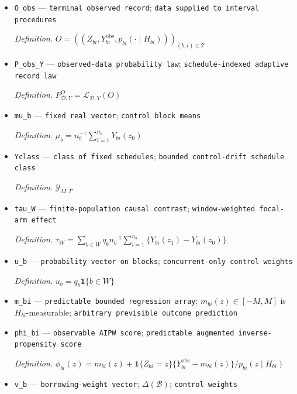 \documentclass{article}
\begin{document}
\begin{itemize}
  \par\smallskip\noindent\emph{Definition.} \(\mathcal D=(p_{bi})_{(b,i)\in\mathcal T}\)
  \item \texttt{O\_\allowbreak{}obs} --- \texttt{terminal observed record}; \texttt{data supplied to interval procedures}
  \par\smallskip\noindent\emph{Definition.} \(O=((Z_{bi},Y^{\mathrm{obs}}_{bi},p_{bi}(\cdot\mid H_{bi})))_{(b,i)\in\mathcal T}\)
  \item \texttt{P\_\allowbreak{}obs\_\allowbreak{}Y} --- \texttt{observed-\allowbreak{}data probability law}; \texttt{schedule-\allowbreak{}indexed adaptive record law}
  \par\smallskip\noindent\emph{Definition.} \(P^O_{\mathcal D,Y}=\mathcal L_{\mathcal D,Y}(O)\)
  \item \texttt{mu\_\allowbreak{}b} --- \texttt{fixed real vector}; \texttt{control block means}
  \par\smallskip\noindent\emph{Definition.} \(\mu_b=n_b^{-1}\sum_{i=1}^{n_b}Y_{bi}(z_0)\)
  \item \texttt{Yclass} --- \texttt{class of fixed schedules}; \texttt{bounded control-\allowbreak{}drift schedule class}
  \par\smallskip\noindent\emph{Definition.} \(\mathcal Y_{M,\Gamma}\)
  \item \texttt{tau\_\allowbreak{}W} --- \texttt{finite-\allowbreak{}population causal contrast}; \texttt{window-\allowbreak{}weighted focal-\allowbreak{}arm effect}
  \par\smallskip\noindent\emph{Definition.} \(\tau_W=\sum_{b\in W}q_b n_b^{-1}\sum_{i=1}^{n_b}\{Y_{bi}(z_1)-Y_{bi}(z_0)\}\)
  \item \texttt{u\_\allowbreak{}b} --- \texttt{probability vector on blocks}; \texttt{concurrent-\allowbreak{}only control weights}
  \par\smallskip\noindent\emph{Definition.} \(u_b=q_b\mathbf 1\{b\in W\}\)
  \item \texttt{m\_\allowbreak{}bi} --- \texttt{predictable bounded regression array}; \(m_{bi}(z)\in[-M,M]\) is \(H_{bi}\)-measurable; \texttt{arbitrary previsible outcome prediction}
  \item \texttt{phi\_\allowbreak{}bi} --- \texttt{observable AIPW score}; \texttt{predictable augmented inverse-\allowbreak{}propensity score}
  \par\smallskip\noindent\emph{Definition.} \(\phi_{bi}(z)=m_{bi}(z)+\mathbf 1\{Z_{bi}=z\}\{Y^{\mathrm{obs}}_{bi}-m_{bi}(z)\}/p_{bi}(z\mid H_{bi})\)
  \item \texttt{v\_\allowbreak{}b} --- \texttt{borrowing-\allowbreak{}weight vector}; \(\Delta(\mathcal B)\); \texttt{control weights}

\end{itemize}
\end{document}
